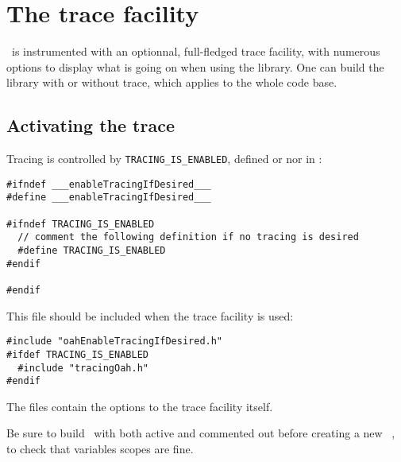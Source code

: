 
\chapter{The trace facility}


\mf\ is instrumented with an optionnal, full-fledged trace facility, with numerous options to display what is going on when using the library.
One can build the library with or without trace, which applies to the whole code base.

\section{Activating the trace}

Tracing is controlled by {\tt TRACING_IS_ENABLED}, defined or nor in :

\begin{lstlisting}[language=CPlusPlus]
#ifndef ___enableTracingIfDesired___
#define ___enableTracingIfDesired___

#ifndef TRACING_IS_ENABLED
  // comment the following definition if no tracing is desired
  #define TRACING_IS_ENABLED
#endif

#endif
\end{lstlisting}

This file should be included when the trace facility is used:
\begin{lstlisting}[language=CPlusPlus]
#include "oahEnableTracingIfDesired.h"
#ifdef TRACING_IS_ENABLED
  #include "tracingOah.h"
#endif
\end{lstlisting}

The files  contain the options to the trace facility itself.

Be sure to build \mf\ with  both active and commented out before creating a new  \version\ \branch, to check that variables scopes are fine.

